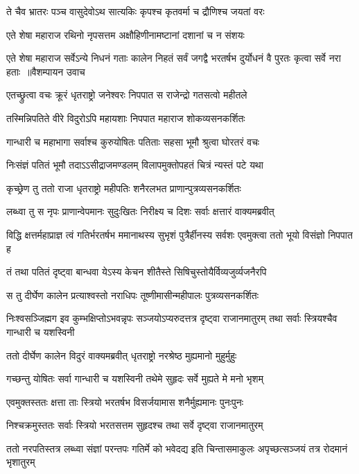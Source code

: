 \twolineshloka
{ते चैव भ्रातरः पञ्च वासुदेवोऽथ सात्यकिः}
{कृपश्च कृतवर्मा च द्रौणिश्च जयतां वरः}


\twolineshloka
{एते शेषा महाराज रथिनो नृपसत्तम}
{अक्षौहिणीनामष्टानां दशानां च न संशयः}


\fourlineindentedshloka
{एते शेषा महाराज सर्वेऽन्ये निधनं गताः}
{कालेन निहतं सर्वं जगद्वै भरतर्षभ}
{दुर्योधनं वै पुरतः कृत्वा सर्वे नरा हताः ॥वैशम्पायन उवाच}
{}


\twolineshloka
{एतच्छ्रुत्वा वचः क्रूरं धृतराष्ट्रो जनेश्वरः}
{निपपात स राजेन्द्रो गतसत्वो महीतले}


\twolineshloka
{तस्मिन्निपतिते वीरे विदुरोऽपि महायशाः}
{निपपात महाराज शोकव्यसनकर्शितः}


\twolineshloka
{गान्धारी च महाभागा सर्वाश्च कुरुयोषितः}
{पतिताः सहसा भूमौ श्रुत्वा घोरतरं वचः}


\twolineshloka
{निःसंज्ञं पतितं भूमौ तदाऽऽसीद्राजमण्डलम्}
{विलापमुक्तोपहतं चित्रं न्यस्तं पटे यथा}


\twolineshloka
{कृच्छ्रेण तु ततो राजा धृतराष्ट्रो महीपतिः}
{शनैरलभत प्राणान्पुत्रव्यसनकर्शितः}


\twolineshloka
{लब्ध्वा तु स नृपः प्राणान्वेपमानः सुदुःखितः}
{निरीक्ष्य च दिशः सर्वाः क्षत्तारं वाक्यमब्रवीत्}


\threelineshloka
{विद्धि क्षत्तर्महाप्राज्ञ त्वं गतिर्भरतर्षभ}
{ममानाथस्य सुभृशं पुत्रैर्हीनस्य सर्वशः}
{एवमुक्त्वा ततो भूयो विसंज्ञो निपपात ह}


\twolineshloka
{तं तथा पतितं दृष्ट्वा बान्धवा येऽस्य केचन}
{शीतैस्ते सिषिचुस्तोयैर्विव्यजुर्व्यजनैरपि}


\twolineshloka
{स तु दीर्घेण कालेन प्रत्याश्वस्तो नराधिपः}
{तूष्णीमासीन्महीपालः पुत्रव्यसनकर्शितः}


निःश्वसञ्जिह्मग इव कुम्भक्षिप्तोऽभवन्नृपः
\twolineshloka
{सञ्जयोऽप्यरुदत्तत्र दृष्ट्वा राजानमातुरम्}
{तथा सर्वाः स्त्रियश्चैव गान्धारी च यशस्विनी}


\twolineshloka
{ततो दीर्घेण कालेन विदुरं वाक्यमब्रवीत्}
{धृतराष्ट्रो नरश्रेष्ठ मुह्यमानो मुहुर्मुहुः}


\twolineshloka
{गच्छन्तु योषितः सर्वा गान्धारी च यशस्विनी}
{तथेमे सुहृदः सर्वे मुह्यते मे मनो भृशम्}


\twolineshloka
{एवमुक्तस्ततः क्षत्ता ताः स्त्रियो भरतर्षभ}
{विसर्जयामास शनैर्मुह्यमानः पुनःपुनः}


\twolineshloka
{निश्चक्रमुस्ततः सर्वाः स्त्रियो भरतसत्तम}
{सुहृदश्च तथा सर्वे दृष्ट्वा राजानमातुरम्}


\threelineshloka
{ततो नरपतिस्तत्र लब्ध्वा संज्ञां परन्तपः}
{गतिर्मे को भवेदद्य इति चिन्तासमाकुलः}
{अपृच्छत्सञ्जयं तत्र रोदमानं भृशातुरम्}


